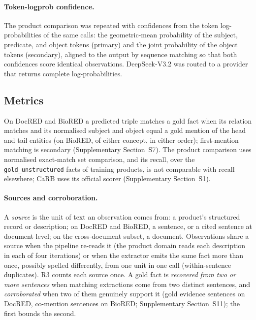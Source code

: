 \documentclass[preprint,12pt,authoryear]{elsarticle}
\begin{document}
\paragraph{Token-logprob confidence.} The product comparison was
repeated with confidences from the token log-probabilities of the same
calls: the geometric-mean probability of the subject, predicate, and
object tokens (primary) and the joint probability of the object tokens
(secondary), aligned to the output by sequence matching so that both
confidences score identical observations. DeepSeek-V3.2 was routed to a
provider that returns complete log-probabilities.

\subsection{Metrics}
\label{sec:setup-metrics}

On DocRED and BioRED a predicted triple matches a gold fact when its
relation matches and its normalised subject and object equal a gold
mention of the head and tail entities (on BioRED, of either concept, in
either order); first-mention matching is secondary (Supplementary
Section~S7). The product comparison uses normalised exact-match set
comparison, and its recall, over the \texttt{gold\_unstructured} facts of
training products, is not comparable with recall elsewhere; CaRB uses its
official scorer (Supplementary Section~S1).

\paragraph{Sources and corroboration.} A \emph{source} is the unit of
text an observation comes from: a product's structured record or
description; on DocRED and BioRED, a sentence, or a cited sentence at
document level; on the cross-document subset, a document. Observations
share a source when the pipeline re-reads it (the product domain reads
each description in each of four iterations) or when the extractor emits
the same fact more than once, possibly spelled differently, from one unit
in one call (within-sentence duplicates). R3 counts each source once. A
gold fact is \emph{recovered from two or more sentences} when matching
extractions come from two distinct sentences, and \emph{corroborated}
when two of them genuinely support it (gold evidence sentences on DocRED,
co-mention sentences on BioRED; Supplementary Section~S11); the first
bounds the second.
\end{document}
